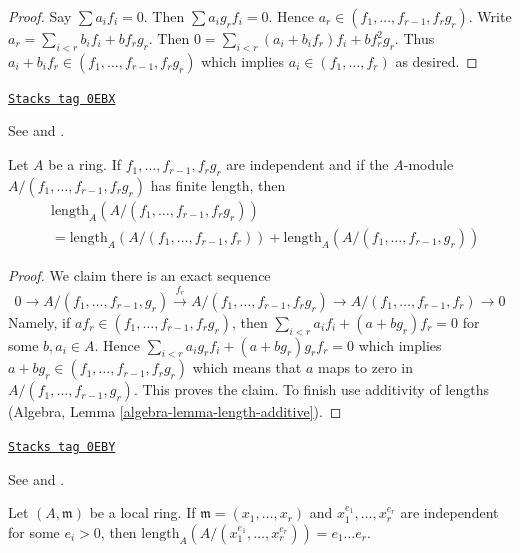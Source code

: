 \begin{proof}
Say $\sum a_if_i = 0$. Then $\sum a_ig_rf_i = 0$.
Hence $a_r \in (f_1, \ldots, f_{r - 1}, f_rg_r)$.
Write $a_r = \sum_{i < r} b_i f_i + b f_rg_r$.
Then $0 = \sum_{i < r} (a_i + b_if_r)f_i + bf_r^2g_r$.
Thus $a_i + b_i f_r \in (f_1, \ldots, f_{r - 1}, f_rg_r)$
which implies $a_i \in (f_1, \ldots, f_r)$ as desired.
\end{proof}

\begin{lemma}[2]
\label{local-cohomology-lemma-2}
\href{https://stacks.math.columbia.edu/tag/0EBX}{\texttt{Stacks tag 0EBX}}

\begin{reference}
See \cite{Lech-inequalities} and \cite[Lemma 2 page 300]{MatCA}.
\end{reference}
Let $A$ be a ring. If $f_1, \ldots, f_{r - 1}, f_rg_r$
are independent and if the $A$-module
$A/(f_1, \ldots, f_{r - 1}, f_rg_r)$ has finite length, then
\begin{align*}
& \text{length}_A(A/(f_1, \ldots, f_{r - 1}, f_rg_r)) \\
& =
\text{length}_A(A/(f_1, \ldots, f_{r - 1}, f_r)) +
\text{length}_A(A/(f_1, \ldots, f_{r - 1}, g_r))
\end{align*}
\end{lemma}

\begin{proof}
We claim there is an exact sequence
$$
0 \to
A/(f_1, \ldots, f_{r - 1}, g_r) \xrightarrow{f_r}
A/(f_1, \ldots, f_{r - 1}, f_rg_r) \to
A/(f_1, \ldots, f_{r - 1}, f_r) \to 0
$$
Namely, if $a f_r \in (f_1, \ldots, f_{r - 1}, f_rg_r)$, then
$\sum_{i < r} a_i f_i + (a + bg_r)f_r = 0$
for some $b, a_i \in A$. Hence
$\sum_{i < r} a_i g_r f_i + (a + bg_r)g_rf_r = 0$
which implies $a + bg_r \in (f_1, \ldots, f_{r - 1}, f_rg_r)$
which means that $a$ maps to zero in $A/(f_1, \ldots, f_{r - 1}, g_r)$.
This proves the claim.
To finish use additivity of lengths
(Algebra, Lemma \ref{algebra-lemma-length-additive}).
\end{proof}

\begin{lemma}[3]
\label{local-cohomology-lemma-3}
\href{https://stacks.math.columbia.edu/tag/0EBY}{\texttt{Stacks tag 0EBY}}

\begin{reference}
See \cite{Lech-inequalities} and \cite[Lemma 3 page 300]{MatCA}.
\end{reference}
Let $(A, \mathfrak m)$ be a local ring. If $\mathfrak m = (x_1, \ldots, x_r)$
and $x_1^{e_1}, \ldots, x_r^{e_r}$ are independent for some $e_i > 0$,
then $\text{length}_A(A/(x_1^{e_1}, \ldots, x_r^{e_r})) = e_1\ldots e_r$.
\end{lemma}

